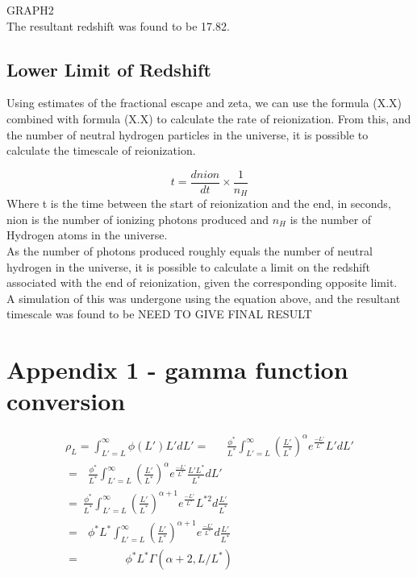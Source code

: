 \documentclass[pdf,color]{UoBnote}
\begin{document}
GRAPH2\\
\newline
The resultant redshift was found to be 17.82.

\subsection{Lower Limit of Redshift}
Using estimates of the fractional escape and zeta, we can use the formula (X.X) combined with formula (X.X) to calculate the rate of reionization. From this, and the number of neutral hydrogen particles in the universe, it is possible to calculate the timescale of reionization. 

\begin{equation}
t =\frac{dnion}{dt}\times \frac{1}{n_H}
\end{equation}
Where t is the time between the start of reionization and the end, in seconds, nion is the number of ionizing photons produced and $n_H$ is the number of Hydrogen atoms in the universe. \\
\newline
As the number of photons produced roughly equals the number of neutral hydrogen in the universe, it is possible to calculate a limit on the redshift associated with the end of reionization, given the corresponding opposite limit. \\
\newline
A simulation of this was undergone using the equation above, and the resultant timescale was found to be NEED TO GIVE FINAL RESULT

\section{Appendix 1 - gamma function conversion}

\begin{eqnarray}
\rho_L = \int^{\infty}_{L'=L} \phi(L')L'dL'=\ \ \ \ \ \ \ \frac{\phi^*}{L^*}\int^{\infty}_{L'=L}\left (\frac{L'}{L^*} \right )^{\alpha}e^\frac{-L'}{L^*}L'dL'\\
= \ \ \ \frac{\phi^*}{L^*}\int^{\infty}_{L'=L}\left (\frac{L'}{L^*}\right )^{\alpha}e^\frac{-L'}{L^*}\frac{L'L^*}{L^*}dL'\\
= \ \frac {\phi^*}{L^*}\int^{\infty}_{L'=L}\left ( \frac{L'}{L^*} \right )^{\alpha+1}e^\frac{-L'}{L^*}L^{*2}d\frac{L'}{L^*} \\
= \ \ \ \phi^*L^*\int^{\infty}_{L'=L}\left ( \frac{L'}{L^*} \right )^{\alpha+1}e^\frac{-L'}{L^*}d\frac{L'}{L^*} \\
= \ \ \ \ \ \ \ \ \ \ \ \ \ \ \ \ \ \ \phi^*L^*\Gamma(\alpha+2, L/L^*)
\end{eqnarray}
\end{document}
